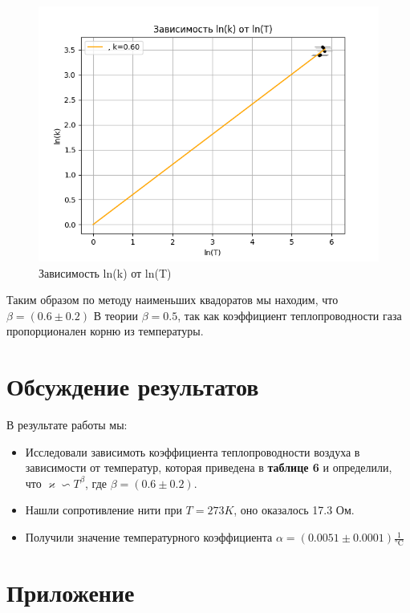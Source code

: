 \documentclass[a4paper, 10pt, twocolumn]{article}
\begin{document}
    \begin{figure}[H]
        \centering
        \includegraphics[width=1\linewidth]{graphs/figure7.png}
        \begin{center}
            \caption{Зависимость ln(k) от ln(T)}
        \end{center}
    \end{figure}

    Таким образом по методу наименьших квадоратов мы находим, что $\beta = (0.6 \pm 0.2)$ 
    В теории $ \beta = 0.5$, так как коэффициент теплопроводности газа пропорционален корню из температуры.
\section{Обсуждение результатов}
    В результате работы мы:
    \begin{itemize}
        \item Исследовали зависимоть коэффициента теплопроводности воздуха в зависимости от температур, которая
        приведена в \textbf{таблице 6} и определили, что $\varkappa \backsim T^\beta$, где $\beta = (0.6 \pm 0.2)$.

        \item Нашли сопротивление нити при $T = 273 K$, оно оказалось 17.3 Ом.

        \item Получили значение температурного коэффициента $\alpha = (0.0051 \pm 0.0001) \frac{1}{\text{°C}}$
    \end{itemize}
    \newpage
\onecolumn
\section{Приложение}
\end{document}

